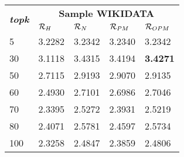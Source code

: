 


%
%
%

\begin{tabular}{|l|llll|}
\hline
       \multirow{2}{*}{\textbf{\textit{topk}}}          & \multicolumn{4}{c|}{\textbf{Sample WIKIDATA}}      \\ \cline{2-5} 
 & $\mathcal{R}_{H}$ & $\mathcal{R}_{N}$ & $\mathcal{R}_{PM}$ & $\mathcal{R}_{OPM}$ \\ \hline
5  & 3.2282 & 3.2342 & 3.2340 & 3.2342\\ %
30   & 3.1118 & 3.4315 & 3.4194 & \textbf{3.4271}\\ %
50   & 2.7115 & 2.9193 & 2.9070 & 2.9135\\ %
60   & 2.4930 & 2.7101 & 2.6986 & 2.7046\\ %
70   & 2.3395 & 2.5272 & 2.3931 & 2.5219\\ %
80   & 2.4071 & 2.5781 & 2.4597 & 2.5734\\ %
100   & 2.3258 & 2.4847 & 2.3859 & 2.4806\\ \hline

\end{tabular}

